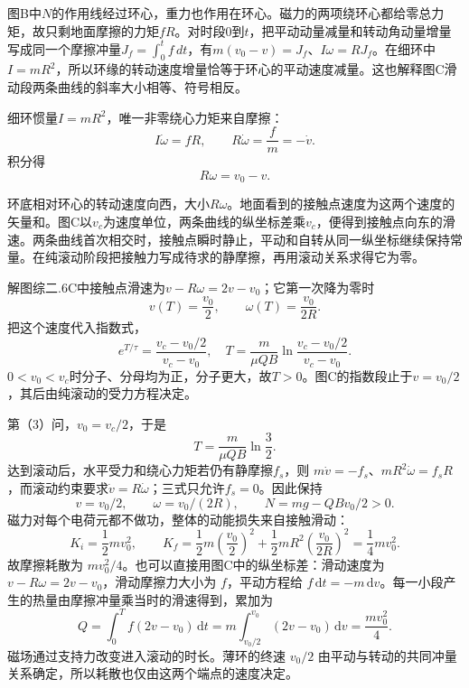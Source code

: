 \documentclass[UTF8,fontset=fandol,a4paper,11pt]{ctexart}
\newcommand{\figcaption}[1]{\par\vspace{2pt}{\small\color{muted}#1}\par}
\begin{document}
图B中$N$的作用线经过环心，重力也作用在环心。磁力的两项绕环心都给零总力矩，故只剩地面摩擦的力矩$fR$。对时段$0$到$t$，把平动动量减量和转动角动量增量写成同一个摩擦冲量$J_f=\int_0^tf\,dt$，有$m(v_0-v)=J_f$、$I\omega=RJ_f$。在细环中$I=mR^2$，所以环缘的转动速度增量恰等于环心的平动速度减量。这也解释图C滑动段两条曲线的斜率大小相等、符号相反。

细环惯量$I=mR^2$，唯一非零绕心力矩来自摩擦：
\[
I\dot\omega=fR,\qquad
R\dot\omega=\frac fm=-\dot v.
\]
积分得
\[
\boxed{R\omega=v_0-v}.
\]
\begin{center}\begin{minipage}{.98\linewidth}\centering
{}
\figcaption{解图综二.6C\quad 平动减慢与自转加快在首次滚动时相接。}
\end{minipage}\end{center}
环底相对环心的转动速度向西，大小$R\omega$。地面看到的接触点速度为这两个速度的矢量和。图C以$v_c$为速度单位，两条曲线的纵坐标差乘$v_c$，便得到接触点向东的滑速。两条曲线首次相交时，接触点瞬时静止，平动和自转从同一纵坐标继续保持常量。在纯滚动阶段把接触力写成待求的静摩擦，再用滚动关系求得它为零。

解图综二.6C中接触点滑速为$v-R\omega=2v-v_0$；它第一次降为零时
\[
\boxed{v(T)=\frac{v_0}{2},\qquad
\omega(T)=\frac{v_0}{2R}}.
\]
把这个速度代入指数式，
\[
e^{T/\tau}=\frac{v_c-v_0/2}{v_c-v_0},
\quad
\boxed{T=\frac{m}{\mu QB}
\ln\frac{v_c-v_0/2}{v_c-v_0}}.
\]
$0<v_0<v_c$时分子、分母均为正，分子更大，故$T>0$。图C的指数段止于$v=v_0/2$，其后由纯滚动的受力方程决定。

第（3）问，$v_0=v_c/2$，于是
\[
\boxed{T=\frac{m}{\mu QB}\ln\frac32}.
\]
达到滚动后，水平受力和绕心力矩若仍有静摩擦$f_s$，则
$m\dot v=-f_s$、$mR^2\dot\omega=f_sR$，而滚动约束要求$\dot v=R\dot\omega$；三式只允许$f_s=0$。因此保持
\[
v=v_0/2,\qquad \omega=v_0/(2R),
\qquad N=mg-QBv_0/2>0.
\]
磁力对每个电荷元都不做功，整体的动能损失来自接触滑动：
\[
K_i=\frac12mv_0^2,\qquad
K_f=\frac12m\left(\frac{v_0}{2}\right)^2
+\frac12mR^2\left(\frac{v_0}{2R}\right)^2
=\frac14mv_0^2.
\]
故摩擦耗散为 $mv_0^2/4$。也可以直接用图C中的纵坐标差：滑动速度为 $v-R\omega=2v-v_0$，滑动摩擦力大小为 $f$，平动方程给 $f\,\mathrm dt=-m\,\mathrm dv$。每一小段产生的热量由摩擦冲量乘当时的滑速得到，累加为
\[
Q=\int_0^T f(2v-v_0)\,\mathrm dt
  =m\int_{v_0/2}^{v_0}(2v-v_0)\,\mathrm dv=\frac{mv_0^2}{4}.
\]
磁场通过支持力改变进入滚动的时长。薄环的终速 $v_0/2$ 由平动与转动的共同冲量关系确定，所以耗散也仅由这两个端点的速度决定。
\end{document}
